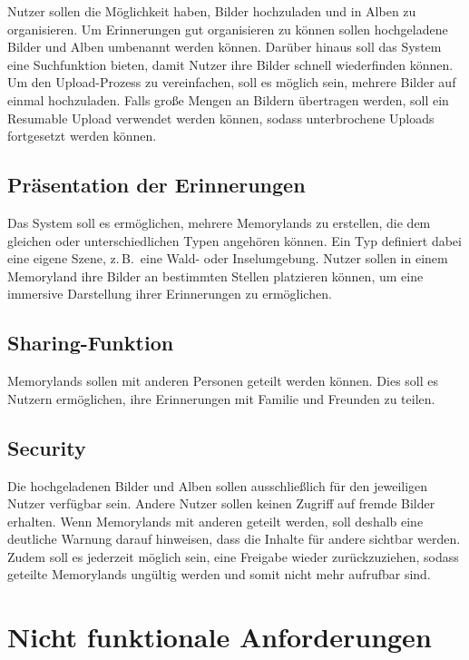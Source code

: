 Nutzer sollen die Möglichkeit haben, Bilder hochzuladen und in Alben zu organisieren. 
Um Erinnerungen gut organisieren zu können sollen hochgeladene Bilder und Alben 
umbenannt werden können. Darüber hinaus soll das System eine Suchfunktion bieten, 
damit Nutzer ihre Bilder schnell wiederfinden können. Um den Upload-Prozess zu 
vereinfachen, soll es möglich sein, mehrere Bilder auf einmal hochzuladen. Falls 
große Mengen an Bildern übertragen werden, soll ein Resumable Upload verwendet werden
können, sodass unterbrochene Uploads fortgesetzt werden können.

\subsection{Präsentation der Erinnerungen}

Das System soll es ermöglichen, mehrere Memorylands zu erstellen, die dem 
gleichen oder unterschiedlichen Typen angehören können. Ein Typ definiert 
dabei eine eigene Szene, z.\,B.\ eine Wald- oder Inselumgebung. Nutzer sollen
in einem Memoryland ihre Bilder an bestimmten Stellen platzieren können, um 
eine immersive Darstellung ihrer Erinnerungen zu ermöglichen.

\subsection{Sharing-Funktion}

Memorylands sollen mit anderen Personen geteilt werden können. Dies soll es 
Nutzern ermöglichen, ihre Erinnerungen mit Familie und Freunden zu teilen.

\subsection{Security}

Die hochgeladenen Bilder und Alben sollen ausschließlich für den jeweiligen Nutzer verfügbar
sein. Andere Nutzer sollen keinen Zugriff auf fremde Bilder erhalten. Wenn Memorylands mit 
anderen geteilt werden, soll deshalb eine deutliche Warnung darauf hinweisen, dass die Inhalte
für andere sichtbar werden. Zudem soll es jederzeit möglich sein, eine Freigabe wieder 
zurückzuziehen, sodass geteilte Memorylands ungültig werden und somit nicht mehr 
aufrufbar sind.

\section{Nicht funktionale Anforderungen}


